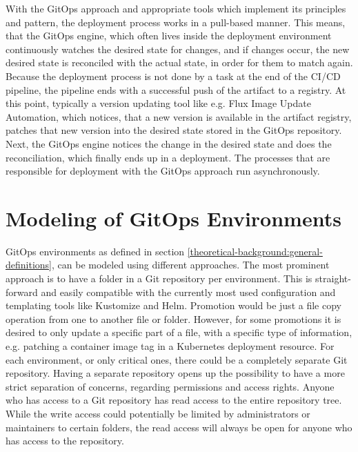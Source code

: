 With the GitOps approach and appropriate tools which implement its principles and pattern,
the deployment process works in a pull-based manner.
This means, that the GitOps engine, which often lives inside the deployment environment
continuously watches the desired state for changes,
and if changes occur, the new desired state is reconciled with the actual state, in order for them to match again.
Because the deployment process is not done by a task at the end of the CI/CD pipeline,
the pipeline ends with a successful push of the artifact to a registry.
At this point, typically a version updating tool like e.g. Flux Image Update Automation, which notices, that a new version is available in
the artifact registry, patches that new version into the desired state stored in the GitOps repository.
Next, the GitOps engine notices the change in the desired state and does the reconciliation,
which finally ends up in a deployment.
The processes that are responsible for deployment with the GitOps approach run asynchronously.







\section{Modeling of GitOps Environments}

GitOps environments as defined in section
\ref{theoretical-background:general-definitions},
can be modeled using different approaches.
The most prominent approach is to have a folder in a Git repository
per environment. This is straight-forward and easily compatible with
the currently most used configuration and templating tools like Kustomize and Helm.
Promotion would be just a file copy operation from one to another file or folder.
However, for some promotions it is desired to only update a specific part of a file,
with a specific type of information, e.g. patching a container image tag in a Kubernetes
deployment resource.
For each environment, or only critical ones, there could be a completely separate Git repository.
Having a separate repository opens up the possibility to have a more strict separation of concerns,
regarding permissions and access rights.
Anyone who has access to a Git repository has read access to the entire repository tree.
While the write access could potentially be limited by administrators or maintainers
to certain folders, the read access will always be open for anyone who has access to the repository.

